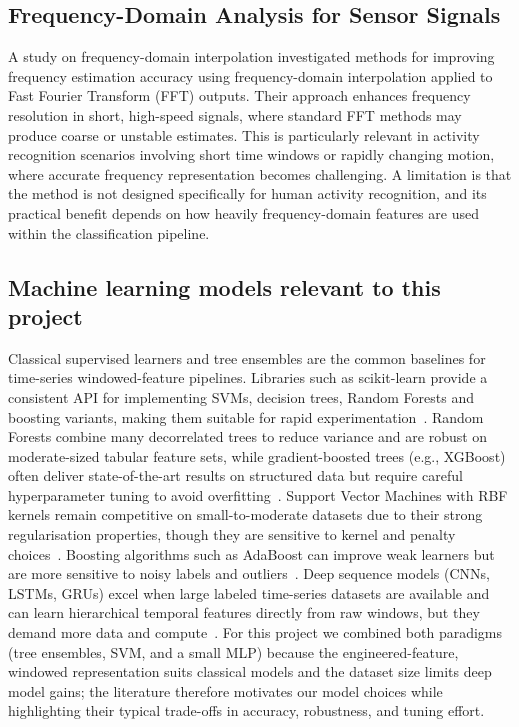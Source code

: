 \documentclass[12pt,a4paper]{cibb}
\begin{document}
\subsection{Frequency-Domain Analysis for Sensor Signals}

A study on frequency-domain interpolation investigated methods for improving frequency 
estimation accuracy using frequency-domain interpolation applied to Fast 
Fourier Transform (FFT) outputs. Their approach enhances frequency 
resolution in short, high-speed signals, where standard FFT methods may 
produce coarse or unstable estimates. This is particularly relevant in 
activity recognition scenarios involving short time windows or rapidly 
changing motion, where accurate frequency representation becomes 
challenging. A limitation is that the method is not designed specifically for human 
activity recognition, and its practical benefit depends on how heavily 
frequency-domain features are used within the classification pipeline.


\subsection{Machine learning models relevant to this project}
Classical supervised learners and tree ensembles are the common baselines for time-series windowed-feature pipelines. Libraries such as scikit-learn provide a consistent API for implementing SVMs, decision trees, Random Forests and boosting variants, making them suitable for rapid experimentation~\cite{scikit-learn}. Random Forests combine many decorrelated trees to reduce variance and are robust on moderate-sized tabular feature sets, while gradient-boosted trees (e.g., XGBoost) often deliver state-of-the-art results on structured data but require careful hyperparameter tuning to avoid overfitting~\cite{breiman2001random,chen2016xgboost,friedman2001gbm}. Support Vector Machines with RBF kernels remain competitive on small-to-moderate datasets due to their strong regularisation properties, though they are sensitive to kernel and penalty choices~\cite{cortes1995svm}. Boosting algorithms such as AdaBoost can improve weak learners but are more sensitive to noisy labels and outliers~\cite{freund1997adaboost}. Deep sequence models (CNNs, LSTMs, GRUs) excel when large labeled time-series datasets are available and can learn hierarchical temporal features directly from raw windows, but they demand more data and compute~\cite{9144538,10689691}. For this project we combined both paradigms (tree ensembles, SVM, and a small MLP) because the engineered-feature, windowed representation suits classical models and the dataset size limits deep model gains; the literature therefore motivates our model choices while highlighting their typical trade-offs in accuracy, robustness, and tuning effort.
\end{document}
